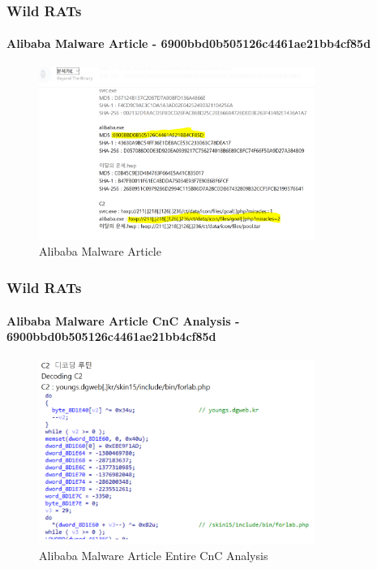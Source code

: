 \documentclass[aspectratio=169]{beamer}
\begin{document}
\begin{frame}
  \frametitle{Wild RATs}
  \framesubtitle{Alibaba Malware Article - 6900bbd0b505126c4461ae21bb4cf85d}
  \begin{center}
    \begin{figure}
      \includegraphics[width=9cm,keepaspectratio]{alibaba_article_0}
      \caption{Alibaba Malware Article}
    \end{figure}
  \end{center}
\end{frame}

\begin{frame}
  \frametitle{Wild RATs}
  \framesubtitle{Alibaba Malware Article CnC Analysis - 6900bbd0b505126c4461ae21bb4cf85d}
  \begin{center}
    \begin{figure}
      \includegraphics[width=9cm,keepaspectratio]{alibaba_article_1}
      \caption{Alibaba Malware Article Entire CnC Analysis}
    \end{figure}
  \end{center}
\end{frame}
\end{document}
